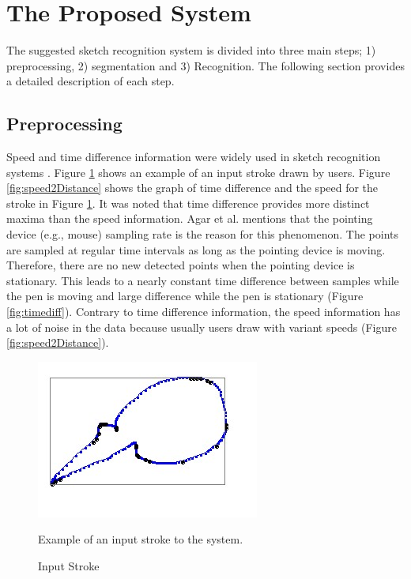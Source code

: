 \documentclass[preprint,10pt,5p,twocolumn]{elsarticle}
\begin{document}
\section{The Proposed System}
\label{Sysdisc}
 The suggested sketch recognition system is divided into three main steps; 1) preprocessing, 2) segmentation and 3) Recognition. The following section provides a detailed description of each step.
 
\subsection{Preprocessing}
\label{Prepross}%
 Speed and time difference information were widely used in sketch recognition systems \cite{earlyprocess}. Figure \ref{fig:orignalStroke} shows an example of an input stroke drawn by users.  Figure \ref{fig:speed2Distance} shows the graph of time difference and the speed for the stroke in Figure \ref{fig:orignalStroke}. It was noted that time difference provides more distinct maxima than the speed information. Agar et al. \cite{polygonfeedback31} mentions that the pointing device (e.g., mouse) sampling rate is the reason for this phenomenon. The points are sampled at regular time intervals as long as the pointing device is moving. Therefore, there are no new detected points when the pointing device is stationary. This leads to a nearly constant time difference between samples while the pen is moving and large difference while the pen is stationary (Figure \ref{fig:timediff}). Contrary to time difference information, the speed information has a lot of noise in the data because usually  users draw with variant speeds (Figure \ref{fig:speed2Distance}).  %

 \begin{figure}[h]
	\centering
		\includegraphics[scale=0.5]{images/stroke3.jpg}
	\caption{Input Stroke} Example of an input stroke to the system. 
	\label{fig:orignalStroke}
\end{figure}
\end{document}
